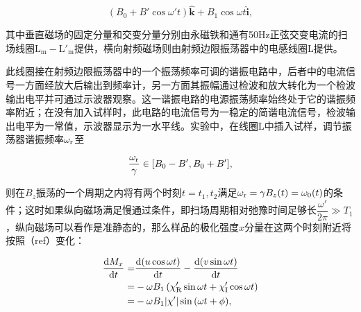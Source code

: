 \begin{equation}
(B_0+B'\cos{\omega' t})\hat{\boldsymbol{k}}+B_1\cos{\omega t}\hat{\boldsymbol{i}},
\end{equation}

其中垂直磁场的固定分量和交变分量分别由永磁铁和通有50Hz正弦交变电流的扫场线圈\(\mathrm{L_m-L'_m}\)提供，横向射频磁场则由射频边限振荡器中的电感线圈\(\mathrm{L}\)提供。

此线圈接在射频边限振荡器中的一个振荡频率可调的谐振电路中，后者中的电流信号一方面经放大后输出到频率计，另一方面其振幅通过检波和放大转化为一个检波输出电平并可通过示波器观察。这一谐振电路的电源振荡频率始终处于它的谐振频率附近；在没有加入试样时，此电路的电流信号为一稳定的简谐电流信号，检波输出电平为一常值，示波器显示为一水平线。实验中，在线圈\(\mathrm{L}\)中插入试样，调节振荡器谐振频率\(\omega_{\rm r}\)至

\begin{equation}
\dfrac{\omega_{\rm r}}{\gamma}\in[B_0-B',B_0+B'],
\end{equation}

则在\(B_z\)振荡的一个周期之内将有两个时刻\(t=t_1,t_2\)满足\(\omega_{\rm r} = \gamma B_z(t)= \omega_0(t)\)的条件；这时如果纵向磁场满足慢通过条件，即扫场周期相对弛豫时间足够长\(\dfrac{\omega'}{2\pi}\gg T_1\)，纵向磁场可以看作是准静态的，那么样品的极化强度\(x\)分量在这两个时刻附近将按照（ref）变化：

\begin{equation}
\begin{aligned}
\dfrac{{\rm d}M_x}{{\rm d}t} = & \dfrac{{\rm d}(u\cos{\omega t})}{{\rm d}t}-\dfrac{{\rm d}(v\sin{\omega t})}{{\rm d}t}\\
 = &-\omega B_1\left(\chi'_{\rm R}\sin{\omega t}+\chi'_{\rm I}\cos{\omega t}\right)\\
 = &-\omega B_1|\chi'|\sin{(\omega t+\phi)},
\end{aligned}
\end{equation}

